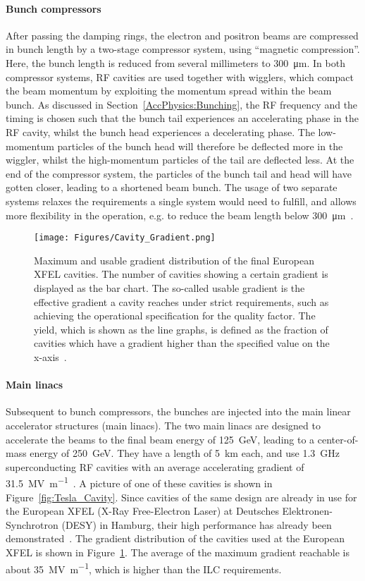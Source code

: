 \paragraph{Bunch compressors}
After passing the damping rings, the electron and positron beams are compressed in bunch length by a two-stage compressor system, using ``magnetic compression''.
Here, the bunch length is reduced from several millimeters to \SI{300}{\micro\meter}.
In both compressor systems, RF cavities are used together with wigglers, which compact the beam momentum by exploiting the momentum spread within the beam bunch.
As discussed in Section~\ref{AccPhysics:Bunching}, the RF frequency and the timing is chosen such that the bunch tail experiences an accelerating phase in the RF cavity, whilst the bunch head experiences a decelerating phase.
The low-momentum particles of the bunch head will therefore be deflected more in the wiggler, whilst the high-momentum particles of the tail are deflected less.
At the end of the compressor system, the particles of the bunch tail and head will have gotten closer, leading to a shortened beam bunch. 
The usage of two separate systems relaxes the requirements a single system would need to fulfill, and allows more flexibility in the operation, e.g. to reduce the beam length below \SI{300}{\micro\meter}~\cite[p. 124]{TDR32}.

\begin{figure}[h!]
\centering
\texttt{[image: Figures/Cavity\_Gradient.png]}
\caption[XFEL cavity gradient]{Maximum and usable gradient distribution of the final European XFEL cavities.
The number of cavities showing a certain gradient is displayed as the bar chart.
The so-called usable gradient is the effective gradient a cavity reaches under strict requirements, such as achieving the operational specification for the quality factor.
The yield, which is shown as the line graphs, is defined as the fraction of cavities which have a gradient higher than the specified value on the x-axis~\cite[p. 18]{XFEL_Cavities}.}
\label{fig:XFEL_cav}
\end{figure}
\paragraph{Main linacs}
Subsequent to bunch compressors, the bunches are injected into the main linear accelerator structures (main linacs).
The two main linacs are designed to accelerate the beams to the final beam energy of \SI{125}{\GeV}, leading to a center-of-mass energy of \SI{250}{\GeV}.
They have a length of \SI{5}{\kilo\meter} each, and use \SI{1.3}{\giga\hertz} superconducting RF cavities with an average accelerating gradient of \SI{31.5}{\mega\volt\per\meter}~\cite{Walker}.
A picture of one of these cavities is shown in Figure~\ref{fig:Tesla_Cavity}. 
Since cavities of the same design are already in use for the European XFEL (X-Ray Free-Electron Laser) at Deutsches Elektronen-Synchrotron (DESY) in Hamburg, their high performance has already been demonstrated~\cite{XFEL}.
The gradient distribution of the cavities used at the European XFEL is shown in Figure~\ref{fig:XFEL_cav}.
The average of the maximum gradient reachable is about \SI{35}{\mega\volt\per\meter}, which is higher than the ILC requirements.

